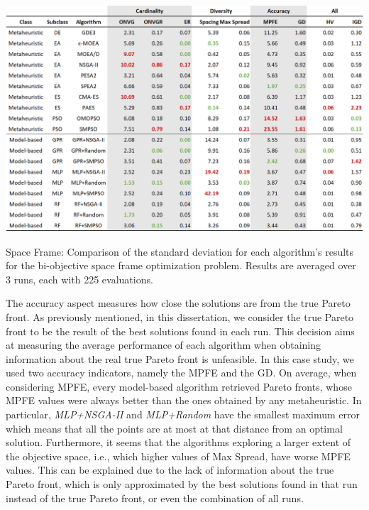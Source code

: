 \begin{table}[h!]
	\centering
	\includegraphics[width=\textwidth]{Images/Evaluation/caadria/Results_Std_20190416.PNG}
	\caption[Space Frame: Standard deviation values of the algorithms' results]{Space Frame: Comparison of the standard deviation for each algorithm's results for the bi-objective space frame optimization problem. Results are averaged over 3 runs, each with 225 evaluations.}
	\label{table:spaceframestd}
\end{table}

The accuracy aspect measures how close the solutions are from the true Pareto front. As previously mentioned, in this dissertation, we consider the true Pareto front to be the result of the best solutions found in each run. This decision aims at measuring the average performance of each algorithm when obtaining information about the real true Pareto front is unfeasible. In this case study, we used two accuracy indicators, namely the \ac{MPFE} and the \ac{GD}. On average, when considering \ac{MPFE}, every model-based algorithm retrieved Pareto fronts, whose \ac{MPFE} values were always better than the ones obtained by any metaheuristic. In particular, \textit{MLP+NSGA-II} and \textit{MLP+Random} have the smallest maximum error which means that all the points are at most at that distance from an optimal solution. Furthermore, it seems that the algorithms exploring a larger extent of the objective space, i.e., which higher values of Max Spread, have worse \ac{MPFE} values. This can be explained due to the lack of information about the true Pareto front, which is only approximated by the best solutions found in that run instead of the true Pareto front, or even the combination of all runs. 

